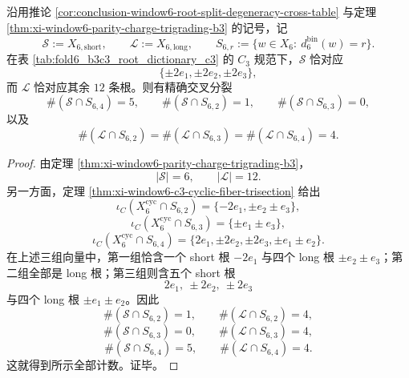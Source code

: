 \begin{theorem}\label{thm:conclusion-window6-short-long-degeneracy-splitting}
沿用推论 \ref{cor:conclusion-window6-root-split-degeneracy-cross-table} 与定理 \ref{thm:xi-window6-parity-charge-trigrading-b3} 的记号，记
\[
\mathcal S:=X_{6,\mathrm{short}},
\qquad
\mathcal L:=X_{6,\mathrm{long}},
\qquad
S_{6,r}:=\{w\in X_6:\ d_6^{\mathrm{bin}}(w)=r\}.
\]
在表 \ref{tab:fold6_b3c3_root_dictionary_c3} 的 \(C_3\) 规范下，\(\mathcal S\) 恰对应
\[
\{\pm 2e_1,\pm 2e_2,\pm 2e_3\},
\]
而 \(\mathcal L\) 恰对应其余 \(12\) 条根。则有精确交叉分裂
\[
\boxed{\;
\#(\mathcal S\cap S_{6,4})=5,\qquad
\#(\mathcal S\cap S_{6,2})=1,\qquad
\#(\mathcal S\cap S_{6,3})=0,\;}
\]
以及
\[
\boxed{\;
\#(\mathcal L\cap S_{6,2})
=
\#(\mathcal L\cap S_{6,3})
=
\#(\mathcal L\cap S_{6,4})
=4.\;}
\]
\end{theorem}
\begin{proof}
由定理 \ref{thm:xi-window6-parity-charge-trigrading-b3}，
\[
|\mathcal S|=6,
\qquad
|\mathcal L|=12.
\]
另一方面，定理 \ref{thm:xi-window6-c3-cyclic-fiber-trisection} 给出
\[
\iota_C(X_6^{\mathrm{cyc}}\cap S_{6,2})
=
\{-2e_1,\pm e_2\pm e_3\},
\]
\[
\iota_C(X_6^{\mathrm{cyc}}\cap S_{6,3})
=
\{\pm e_1\pm e_3\},
\]
\[
\iota_C(X_6^{\mathrm{cyc}}\cap S_{6,4})
=
\{2e_1,\pm 2e_2,\pm 2e_3,\pm e_1\pm e_2\}.
\]
在上述三组向量中，第一组恰含一个 short 根 \(-2e_1\) 与四个 long 根 \(\pm e_2\pm e_3\)；第二组全部是 long 根；第三组则含五个 short 根
\[
2e_1,\ \pm 2e_2,\ \pm 2e_3
\]
与四个 long 根 \(\pm e_1\pm e_2\)。因此
\[
\#(\mathcal S\cap S_{6,2})=1,\qquad
\#(\mathcal L\cap S_{6,2})=4,
\]
\[
\#(\mathcal S\cap S_{6,3})=0,\qquad
\#(\mathcal L\cap S_{6,3})=4,
\]
\[
\#(\mathcal S\cap S_{6,4})=5,\qquad
\#(\mathcal L\cap S_{6,4})=4.
\]
这就得到所示全部计数。证毕。
\end{proof}

